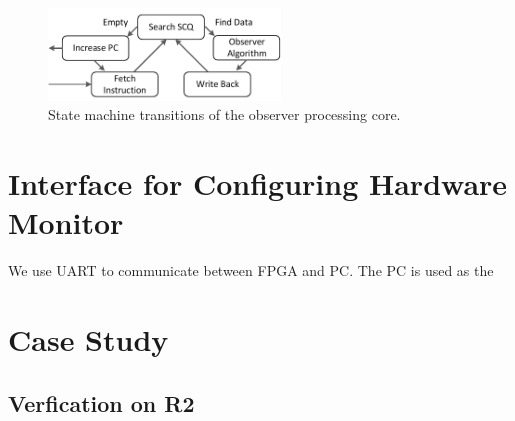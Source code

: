 \begin{figure}
\centering
\includegraphics[width=0.55\textwidth]{../fig/wf.pdf}
\caption{\label{fig:wf}State machine transitions of the observer processing core.}
\end{figure}


\section*{Interface for Configuring Hardware Monitor}
We use UART to communicate between FPGA and PC. The PC is used as the 


\section*{Case Study}
\subsection{Verfication on R2}


